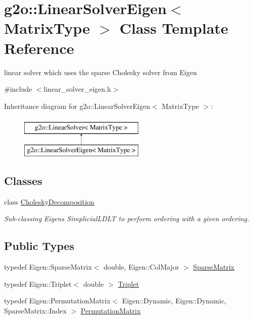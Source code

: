 \hypertarget{classg2o_1_1_linear_solver_eigen}{}\section{g2o\+:\+:Linear\+Solver\+Eigen$<$ Matrix\+Type $>$ Class Template Reference}
\label{classg2o_1_1_linear_solver_eigen}


linear solver which uses the sparse Cholesky solver from Eigen  




{\ttfamily \#include $<$linear\+\_\+solver\+\_\+eigen.\+h$>$}

Inheritance diagram for g2o\+:\+:Linear\+Solver\+Eigen$<$ Matrix\+Type $>$\+:\begin{figure}[H]
\begin{center}
\leavevmode
\includegraphics[height=2.000000cm]{classg2o_1_1_linear_solver_eigen}
\end{center}
\end{figure}
\subsection*{Classes}
\begin{DoxyCompactItemize}
\item 
class \mbox{\hyperlink{classg2o_1_1_linear_solver_eigen_1_1_cholesky_decomposition}{Cholesky\+Decomposition}}
\begin{DoxyCompactList}\small\item\em Sub-\/classing Eigen\textquotesingle{}s Simplicial\+L\+D\+LT to perform ordering with a given ordering. \end{DoxyCompactList}\end{DoxyCompactItemize}
\subsection*{Public Types}
\begin{DoxyCompactItemize}
\item 
typedef Eigen\+::\+Sparse\+Matrix$<$ double, Eigen\+::\+Col\+Major $>$ \mbox{\hyperlink{classg2o_1_1_linear_solver_eigen_aeb7e2400bed3a249b5f29ce7cc00cd33}{Sparse\+Matrix}}
\item 
typedef Eigen\+::\+Triplet$<$ double $>$ \mbox{\hyperlink{classg2o_1_1_linear_solver_eigen_a602c24e05d2f46022aa1827fdbc45638}{Triplet}}
\item 
typedef Eigen\+::\+Permutation\+Matrix$<$ Eigen\+::\+Dynamic, Eigen\+::\+Dynamic, Sparse\+Matrix\+::\+Index $>$ \mbox{\hyperlink{classg2o_1_1_linear_solver_eigen_acd9dd4e15dfbbad2720f1b83519333e8}{Permutation\+Matrix}}
\end{DoxyCompactItemize}
